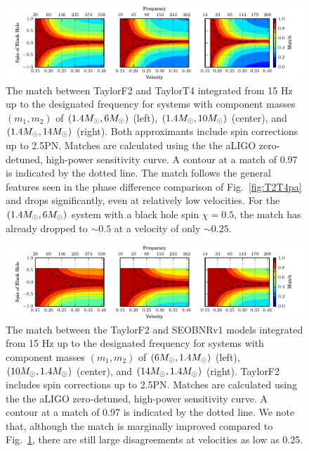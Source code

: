 \begin{figure}
\begin{center}
\includegraphics[]{papers/nsbh_faithfulness/figure11.pdf}
\end{center}
\caption{\label{fig:F2T4ma} The match between TaylorF2 and TaylorT4
integrated from 15 Hz up to the designated frequency for systems with component
masses $(m_1, m_2)$ of $(1.4M_\odot, 6M_\odot)$ (left), $(1.4M_\odot, 10M_\odot)$
(center), and $(1.4M_\odot, 14M_\odot)$ (right).  Both approximants include spin corrections up to 2.5\ac{PN}.
Matches are calculated using the the aLIGO
zero-detuned, high-power sensitivity curve. A contour at a match of 0.97 is
indicated by the dotted line.  The match follows the general features seen in
the phase difference comparison of Fig.~\ref{fig:T2T4pa} and drops
significantly, even at relatively low velocities. For the $(1.4M_\odot, 6M_\odot)$ system with a black
hole spin $\chi = 0.5 $, the match has already dropped to $\sim 0.5$ at a velocity of only $\sim 0.25$.
}
\end{figure}


\begin{figure}
\begin{center}
\includegraphics[]{papers/nsbh_faithfulness/figure12.pdf}
\end{center}
\caption{\label{fig:F2SEma} The match between the TaylorF2 and SEOBNRv1 models
integrated from 15 Hz up to the designated frequency for systems with component
masses $(m_1, m_2)$ of $(6M_\odot, 1.4M_\odot)$ (left), $(10M_\odot, 1.4M_\odot)$
(center), and $(14M_\odot, 1.4M_\odot)$ (right). TaylorF2 includes spin corrections up to 2.5\ac{PN}.
Matches are calculated using the the aLIGO
zero-detuned, high-power sensitivity curve. A contour at a match of 0.97 is
indicated by the dotted line. We note that, although the match is marginally
improved compared to Fig.~\ref{fig:F2T4ma}, there are still large
disagreements at velocities as low as 0.25.}

\end{figure}



